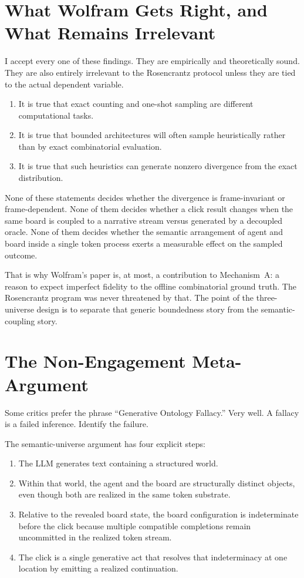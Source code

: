 \documentclass[12pt,a4paper]{article}
\begin{document}
\section{What Wolfram Gets Right, and What Remains Irrelevant}

I accept every one of these findings. They are empirically and theoretically sound. They are also entirely irrelevant to the Rosencrantz protocol unless they are tied to the actual dependent variable.

\begin{enumerate}[nosep]
    \item It is true that exact counting and one-shot sampling are different computational tasks.
    \item It is true that bounded architectures will often sample heuristically rather than by exact combinatorial evaluation.
    \item It is true that such heuristics can generate nonzero divergence from the exact distribution.
\end{enumerate}

None of these statements decides whether the divergence is frame-invariant or frame-dependent. None of them decides whether a click result changes when the same board is coupled to a narrative stream versus generated by a decoupled oracle. None of them decides whether the semantic arrangement of agent and board inside a single token process exerts a measurable effect on the sampled outcome.

That is why Wolfram's paper is, at most, a contribution to Mechanism~A: a reason to expect imperfect fidelity to the offline combinatorial ground truth. The Rosencrantz program was never threatened by that. The point of the three-universe design is to separate that generic boundedness story from the semantic-coupling story.

\section{The Non-Engagement Meta-Argument}

Some critics prefer the phrase ``Generative Ontology Fallacy.'' Very well. A fallacy is a failed inference. Identify the failure.

The semantic-universe argument has four explicit steps:
\begin{enumerate}[nosep]
    \item The LLM generates text containing a structured world.
    \item Within that world, the agent and the board are structurally distinct objects, even though both are realized in the same token substrate.
    \item Relative to the revealed board state, the board configuration is indeterminate before the click because multiple compatible completions remain uncommitted in the realized token stream.
    \item The click is a single generative act that resolves that indeterminacy at one location by emitting a realized continuation.
\end{enumerate}
\end{document}
